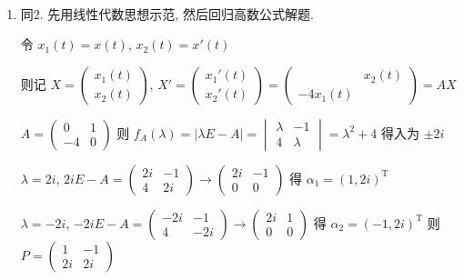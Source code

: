 	 \paragraph{} %
		 \begin{enumerate}
			 \item %
			       同2. 先用线性代数思想示范, 然后回归高数公式解题.

			       令 \( x_{1}(t) = x(t) \), \( x_{2}(t) = x'(t) \)

			       则记 \( X = \begin{pmatrix}
				       x_{1}(t) \\
				       x_{2}(t)
			       \end{pmatrix} \), \( X' = \begin{pmatrix}
				       x_{1}'(t) \\
				       x_{2}'(t)
			       \end{pmatrix} = \begin{pmatrix}
				                  & x_{2}(t) \\
				       -4x_{1}(t) &
			       \end{pmatrix} = AX \)

			       \( A = \begin{pmatrix}
				       0  & 1 \\
				       -4 & 0
			       \end{pmatrix} \) 则 \( f_{A}(\lambda) = |\lambda E - A| = \begin{vmatrix}
				       \lambda & -1      \\
				       4       & \lambda
			       \end{vmatrix} = \lambda^{2} + 4 \) 得入为 \( \pm 2i \)

			       \( \lambda = 2i \), \( 2iE - A = \begin{pmatrix}
				       2i & -1 \\
				       4  & 2i
			       \end{pmatrix} \rightarrow \begin{pmatrix}
				       2i & -1 \\
				       0  & 0
			       \end{pmatrix} \) 得 \( \alpha_{1} = (1, 2i)^{\mathrm{T}} \)

			       \( \lambda = -2i \), \( -2iE - A = \begin{pmatrix}
				       -2i & -1  \\
				       4   & -2i
			       \end{pmatrix} \rightarrow \begin{pmatrix}
				       2i & 1 \\
				       0  & 0
			       \end{pmatrix} \) 得 \( \alpha_{2} = (-1, 2i)^{\mathrm{T}} \) 则 \( P = \begin{pmatrix}
				       1  & -1 \\
				       2i & 2i
			       \end{pmatrix} \)


\end{enumerate}

